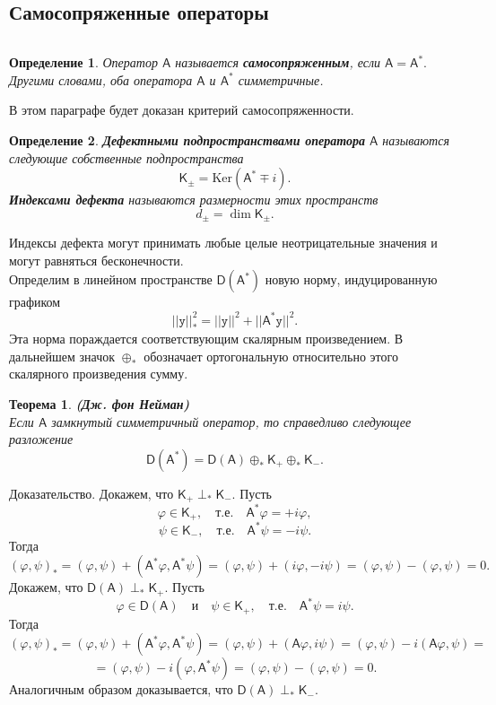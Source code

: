 \documentclass[12 pt, a4 paper]{article}
\theoremstyle{plain}   \newtheorem{Pro}{Задача}
\newtheorem{Def}{Определение}
\newtheorem{The}{Теорема}
\begin{document}
\subsection{Самосопряженные операторы}
$ \; $
\\
\begin{Def}
Оператор
$ \mathsf{A} $
называется
{\bfseries самосопряженным},
если
$ \mathsf{A}=\mathsf{A}^{\ast} . $
Другими словами, оба оператора
$ \mathsf{A} $
и
$ \mathsf{A}^{\ast} $
симметричные.
\end{Def}
В этом параграфе будет доказан критерий самосопряженности.
\begin{Def}
{\bfseries Дефектными подпространствами оператора}
$ \mathsf{A} $
называются следующие собственные подпространства
$$
  \mathsf{K}_{\pm}= \mathrm{Ker}
  (\mathsf{A}^{\ast} \mp i).
$$
{\bfseries Индексами дефекта}
называются размерности этих пространств
$$
  d_{\pm}=\dim \mathsf{K}_{\pm}.
$$
\end{Def}
Индексы дефекта могут принимать любые целые неотрицательные
значения и могут равняться бесконечности.
\\

Определим в линейном пространстве
$ \mathsf{D}(\mathsf{A}^{\ast}) $
новую норму, индуцированную графиком
$$
  ||\mathtt{y}||_{\ast}^2 =
  ||\mathtt{y}||^2 +
  ||\mathsf{A}^{\ast}\mathtt{y}||^2 .
$$
Эта норма пораждается соответствующим скалярным произведением.
В дальнейшем значок
$ \oplus _{\ast} $
обозначает ортогональную относительно этого скалярного
произведения сумму.
\begin{The}
{\bfseries (Дж. фон Нейман)}
\\
Если
$ \mathsf{A} $
замкнутый симметричный оператор, то справедливо следующее разложение
$$
  \mathsf{D}(\mathsf{A}^{\ast})=
  \mathsf{D}(\mathsf{A}) \oplus _{\ast}
  \mathsf{K}_+ \oplus _{\ast} \mathsf{K}_- .
$$
\end{The}
{\Large Доказательство.}
Докажем, что
$ \mathsf{K}_+ \perp _{\ast} \mathsf{K}_- . $
Пусть
$$
  \varphi \in \mathsf{K}_+ , \quad т.е. \quad
  \mathsf{A}^{\ast} \varphi = +i \varphi ,
$$
$$
  \psi \in \mathsf{K}_- , \quad т.е. \quad
  \mathsf{A}^{\ast} \psi =-i \psi .    		
$$
Тогда
$$
  (\varphi , \psi )_{\ast}=(\varphi , \psi )+
  (\mathsf{A}^{\ast} \varphi , \mathsf{A}^{\ast} \psi ) =
  (\varphi , \psi ) + (i\varphi , -i \psi )=
  (\varphi , \psi )-(\varphi , \psi) =0.
$$
Докажем, что
$ \mathsf{D}(\mathsf{A}) \perp _{\ast} \mathsf{K}_+ . $
Пусть
$$
  \varphi \in \mathsf{D}(\mathsf{A}) \quad и \quad
  \psi \in \mathsf{K}_+ , \quad т.е. \quad
  \mathsf{A}^{\ast}\psi =i\psi .
$$
Тогда
$$
  (\varphi , \psi )_{\ast}=(\varphi , \psi )+
  (\mathsf{A}^{\ast} \varphi , \mathsf{A}^{\ast} \psi )=
  (\varphi , \psi )+(\mathsf{A}\varphi , i\psi )=
  (\varphi , \psi ) -i (\mathsf{A}\varphi , \psi )=
$$
$$
  =(\varphi , \psi )-i (\varphi , \mathsf{A}^{\ast}\psi )=
  (\varphi , \psi )-(\varphi , \psi)=0.
$$
Аналогичным образом доказывается, что
$ \mathsf{D}(\mathsf{A}) \perp _{\ast} \mathsf{K}_- . $
\\
\end{document}
